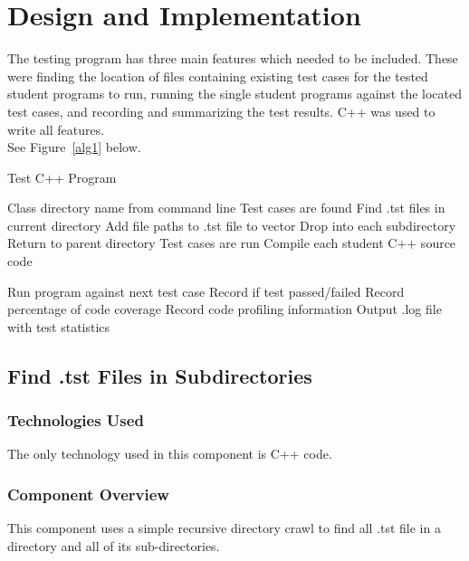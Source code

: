 \chapter{Design  and Implementation}
The testing program has three main features which needed to be included. These were finding the location of files containing existing test cases for the tested student programs to run, running the single student programs against the located test cases, and recording and summarizing the test results. C++ was used to write all features.
\\ See Figure~\ref{alg1} below.
\begin{algorithm} [tbh]                     %
\caption{Test C++ Program}          %
\label{alg1}                           %
\begin{algorithmic}                    %
    \REQUIRE Class directory name from command line
    \ENSURE Test cases are found
        \STATE Find .tst files in current directory
        \STATE Add file paths to .tst file to vector
        \STATE Drop into each subdirectory
    \ELSE
        \STATE Return to parent directory
    \ENDIF
    \ENSURE Test cases are run
    \STATE Compile each student C++ source code
        
        \STATE Run program against next test case
        \STATE Record if test passed/failed
       \STATE Record percentage of code coverage
        \STATE Record code profiling information
    \ENDIF
    \ENDWHILE
    \STATE Output .log file with test statistics
\end{algorithmic}
\end{algorithm} 
 

\section{Find .tst Files in Subdirectories }

\subsection{Technologies  Used}
The only technology used in this component is C++ code.

\subsection{Component  Overview}
This component uses a simple recursive directory crawl to find all .tst file in a directory and all of its sub-directories.

